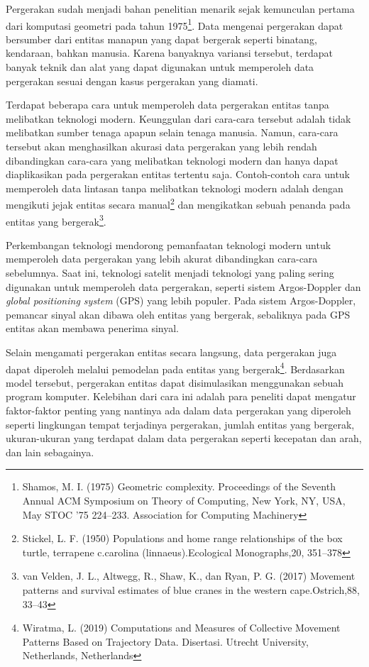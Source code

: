 \documentclass[a4paper,twoside]{article}
\begin{document}
Pergerakan sudah menjadi bahan penelitian menarik sejak kemunculan pertama dari komputasi geometri pada tahun 1975\footnote{Shamos, M. I. (1975) Geometric complexity. Proceedings of the Seventh Annual ACM Symposium on Theory of Computing, New York, NY, USA, May STOC ’75 224–233. Association for Computing Machinery}. Data mengenai pergerakan dapat bersumber dari entitas manapun yang dapat bergerak seperti binatang, kendaraan, bahkan manusia. Karena banyaknya variansi tersebut, terdapat banyak teknik dan alat yang dapat digunakan untuk memperoleh data pergerakan sesuai dengan kasus pergerakan yang diamati.

Terdapat beberapa cara untuk memperoleh data pergerakan entitas tanpa melibatkan teknologi modern. Keunggulan dari cara-cara tersebut adalah tidak melibatkan sumber tenaga apapun selain tenaga manusia. Namun, cara-cara tersebut akan menghasilkan akurasi data pergerakan yang lebih rendah dibandingkan cara-cara yang melibatkan teknologi modern dan hanya dapat diaplikasikan pada pergerakan entitas tertentu saja. Contoh-contoh cara untuk memperoleh data lintasan tanpa melibatkan teknologi modern adalah dengan mengikuti jejak entitas secara manual\footnote{Stickel, L. F. (1950) Populations and home range relationships of the box turtle, terrapene c.carolina (linnaeus).Ecological Monographs,20, 351–378} dan mengikatkan sebuah penanda pada entitas yang bergerak\footnote{van Velden, J. L., Altwegg, R., Shaw, K., dan Ryan, P. G. (2017) Movement patterns and survival estimates of blue cranes in the western cape.Ostrich,88, 33–43}.

Perkembangan teknologi mendorong pemanfaatan teknologi modern untuk memperoleh data pergerakan yang lebih akurat dibandingkan cara-cara sebelumnya. Saat ini, teknologi satelit menjadi teknologi yang paling sering digunakan untuk memperoleh data pergerakan, seperti sistem Argos-Doppler dan \textit{global positioning system} (GPS) yang lebih populer. Pada sistem Argos-Doppler, pemancar sinyal akan dibawa oleh entitas yang bergerak, sebaliknya pada GPS entitas akan membawa penerima sinyal.

Selain mengamati pergerakan entitas secara langsung, data pergerakan juga dapat diperoleh melalui pemodelan pada entitas yang bergerak\footnote{Wiratma, L. (2019) Computations and Measures of Collective Movement Patterns Based on Trajectory Data. Disertasi. Utrecht University, Netherlands, Netherlands}. Berdasarkan model tersebut, pergerakan entitas dapat disimulasikan menggunakan sebuah program komputer. Kelebihan dari cara ini adalah para peneliti dapat mengatur faktor-faktor penting yang nantinya ada dalam data pergerakan yang diperoleh seperti lingkungan tempat terjadinya pergerakan, jumlah entitas yang bergerak, ukuran-ukuran yang terdapat dalam data pergerakan seperti kecepatan dan arah, dan lain sebagainya. 
\end{document}
